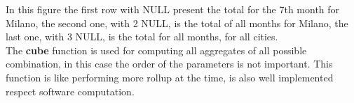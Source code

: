 \documentclass[12pt]{article}
\begin{document}
In this figure the first row with NULL present the total for the 7th month for Milano, the second one, with 2 NULL, is the total of all months for Milano, the last one, with 3 NULL, is the total for all months, for all cities.\\
The \textbf{cube} function is used for computing all aggregates of all possible combination, in this case the order of the parameters is not important. This function is like performing more rollup at the time, is also well implemented respect software computation.


\end{document}
